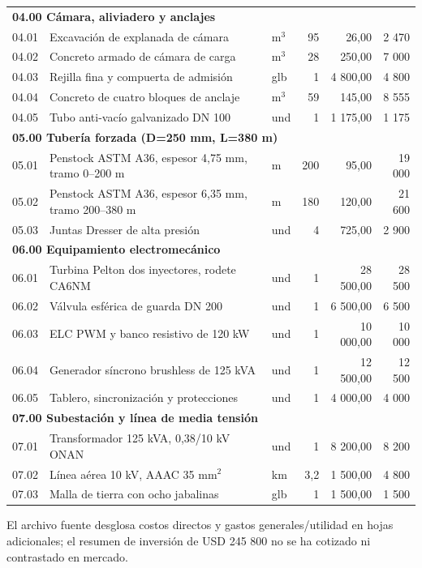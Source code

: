 \documentclass[11pt,a4paper]{article}
\begin{document}
\begin{longtable}{p{.8cm}p{6.0cm}p{.8cm}r r r}
\multicolumn{6}{l}{\textbf{04.00 Cámara, aliviadero y anclajes}}\\
04.01 & Excavación de explanada de cámara & m$^3$ & 95 & 26,00 & 2 470\\
04.02 & Concreto armado de cámara de carga & m$^3$ & 28 & 250,00 & 7 000\\
04.03 & Rejilla fina y compuerta de admisión & glb & 1 & 4 800,00 & 4 800\\
04.04 & Concreto de cuatro bloques de anclaje & m$^3$ & 59 & 145,00 & 8 555\\
04.05 & Tubo anti-vacío galvanizado DN 100 & und & 1 & 1 175,00 & 1 175\\
\multicolumn{6}{l}{\textbf{05.00 Tubería forzada (D=250 mm, L=380 m)}}\\
05.01 & Penstock ASTM A36, espesor 4,75 mm, tramo 0--200 m & m & 200 & 95,00 & 19 000\\
05.02 & Penstock ASTM A36, espesor 6,35 mm, tramo 200--380 m & m & 180 & 120,00 & 21 600\\
05.03 & Juntas Dresser de alta presión & und & 4 & 725,00 & 2 900\\
\multicolumn{6}{l}{\textbf{06.00 Equipamiento electromecánico}}\\
06.01 & Turbina Pelton dos inyectores, rodete CA6NM & und & 1 & 28 500,00 & 28 500\\
06.02 & Válvula esférica de guarda DN 200 & und & 1 & 6 500,00 & 6 500\\
06.03 & ELC PWM y banco resistivo de 120 kW & und & 1 & 10 000,00 & 10 000\\
06.04 & Generador síncrono brushless de 125 kVA & und & 1 & 12 500,00 & 12 500\\
06.05 & Tablero, sincronización y protecciones & und & 1 & 4 000,00 & 4 000\\
\multicolumn{6}{l}{\textbf{07.00 Subestación y línea de media tensión}}\\
07.01 & Transformador 125 kVA, 0,38/10 kV ONAN & und & 1 & 8 200,00 & 8 200\\
07.02 & Línea aérea 10 kV, AAAC 35 mm$^2$ & km & 3,2 & 1 500,00 & 4 800\\
07.03 & Malla de tierra con ocho jabalinas & glb & 1 & 1 500,00 & 1 500\\
\bottomrule
\end{longtable}
El archivo fuente desglosa costos directos y gastos generales/utilidad en hojas adicionales; el resumen de inversión de USD 245 800 no se ha cotizado ni contrastado en mercado.
\end{document}
